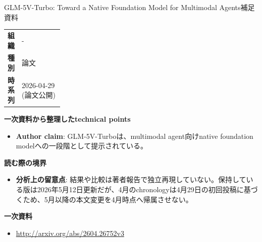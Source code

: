 \begin{technicalnote}{GLM-5V-Turbo: Toward a Native Foundation Model for Multimodal Agents}{補足資料}
\begingroup
\begin{tabularx}{\linewidth}{@{}>{\bfseries}p{0.22\linewidth}X@{}}
組織 & - \\
種別 & 論文 \\
時系列 & 2026-04-29 (論文公開) \\
\end{tabularx}
\smallskip
{\bfseries 一次資料から整理したtechnical points}
\begin{itemize}[leftmargin=1.5em,itemsep=0.35em]
\item \textbf{Author claim}: GLM-5V-Turboは、multimodal agent向けnative foundation modelへの一段階として提示されている。
\end{itemize}
\begin{minipage}{\linewidth}
{\bfseries 読む際の境界}
\begin{itemize}[leftmargin=1.5em,itemsep=0.35em]
\item \textbf{分析上の留意点}: 結果や比較は著者報告で独立再現していない。保持している版は2026年5月12日更新だが、4月のchronologyは4月29日の初回投稿に基づくため、5月以降の本文変更を4月時点へ帰属させない。
\end{itemize}
\begin{samepage}
{\bfseries 一次資料}
\begingroup\sloppy
\begin{itemize}[leftmargin=1.5em,itemsep=0.25em]
\item {\scriptsize\url{http://arxiv.org/abs/2604.26752v3}}
\end{itemize}
\endgroup
\end{samepage}
\end{minipage}
\endgroup
\end{technicalnote}
\medskip

